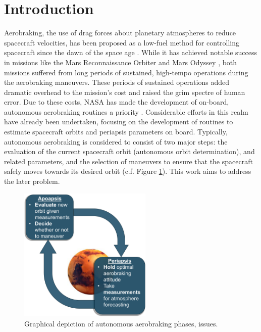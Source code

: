 \documentclass[paper,11pt]{AAS}		%
\begin{document}
\section{Introduction}
Aerobraking, the use of drag forces about planetary atmospheres to reduce spacecraft velocities, has been proposed as a 
low-fuel method for controlling spacecraft since the dawn of the space age \cite{Vallado2013}. While it has achieved 
notable success in missions like the Mars Reconnaissance Orbiter and Mars Odyssey \cite{Long2008}, both missions suffered from 
long periods of sustained, high-tempo operations during the aerobraking maneuvers. These periods of sustained operations added 
dramatic overhead to the mission's cost and raised the grim spectre of human error. Due to these costs, NASA has made the 
development of on-board, autonomous aerobraking routines a priority \cite{Long2008}. Considerable efforts in this realm have 
already 
been undertaken, focusing on the development of routines to estimate spacecraft orbits and periapsis parameters on board. 
Typically, autonomous aerobraking is considered to consist of two major steps: the evaluation of the current spacecraft orbit 
(autonomous orbit determination),
and 
related parameters, and the selection of maneuvers to ensure that the spacecraft safely moves towards its desired orbit (c.f. 
Figure \ref{fig:aerobrakingChoices}). This work aims to address the later problem.

\begin{figure}[!b]
	\centering
	\includegraphics[width=2.5in]{aeroDecisionmaking.png}
	\caption{Graphical depiction of autonomous aerobraking phases, issues.}
	\label{fig:aerobrakingChoices}
\end{figure}
\end{document}
